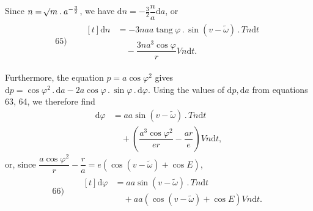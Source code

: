 Since \(n=\mathord{{}^{}\!\surd}m\mathbin{.}a^{-\frac32}\), we have \(\mathrm{d}n=-\tfrac32\dfrac{n}{a}\mathrm{d}a\), or
\[
\begin{array}{rl}
65)\quad&\begin{aligned}[t]\mathrm{d}n&=-3naa\operatorname{tang}\varphi\mathbin{.}\sin(v-\tilde\omega)\mathbin{.}Tn\mathrm{d}t\\&\quad-\dfrac{3na^3\cos\varphi}{r}Vn\mathrm{d}t.\end{aligned}
\end{array}
\]
\par Furthermore, the equation \(p=a\cos\varphi^2\) gives \(\mathrm{d}p=\cos\varphi^2\mathbin{.}\mathrm{d}a-2a\cos\varphi\mathbin{.}\sin\varphi\mathbin{.}\mathrm{d}\varphi\). Using the values of \(\mathrm{d}p,\mathrm{d}a\) from equations 63, 64, we therefore find
\[
\begin{aligned}
\mathrm{d}\varphi&=aa\sin(v-\tilde\omega)\mathbin{.}Tn\mathrm{d}t\\
&\quad+\left(\dfrac{a^3\cos\varphi^2}{er}-\dfrac{ar}{e}\right)Vn\mathrm{d}t,
\end{aligned}
\]
or, since \(\dfrac{a\cos\varphi^2}{r}-\dfrac{r}{a}=e(\cos(v-\tilde\omega)+\cos E)\),
\[
\begin{array}{rl}
66)\quad&\begin{aligned}[t]\mathrm{d}\varphi&=aa\sin(v-\tilde\omega)\mathbin{.}Tn\mathrm{d}t\\&\quad+aa(\cos(v-\tilde\omega)+\cos E)Vn\mathrm{d}t.\end{aligned}
\end{array}
\]
